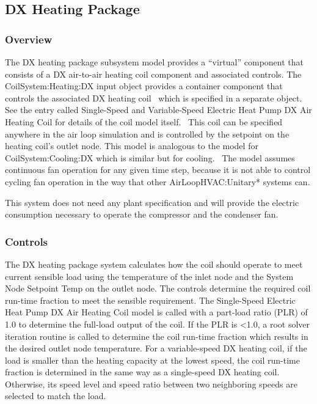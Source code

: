 \subsection{DX Heating Package}\label{dx-heating-package}

\subsubsection{Overview}\label{overview-6}

The DX heating package subsystem model provides a ``virtual'' component that consists of a DX air-to-air heating coil component and associated controls. The CoilSystem:Heating:DX input object provides a container component that controls the associated DX heating coil~ which is specified in a separate object. See the entry called Single-Speed and Variable-Speed Electric Heat Pump DX Air Heating Coil for details of the coil model itself.~ This coil can be specified anywhere in the air loop simulation and is controlled by the setpoint on the heating coil's outlet node. This model is analogous to the model for CoilSystem:Cooling:DX which is similar but for cooling.~ The model assumes continuous fan operation for any given time step, because it is not able to control cycling fan operation in the way that other AirLoopHVAC:Unitary* systems can.

This system does not need any plant specification and will provide the electric consumption necessary to operate the compressor and the condenser fan.

\subsubsection{Controls}\label{controls-2}

The DX heating package system calculates how the coil should operate to meet current sensible load using the temperature of the inlet node and the System Node Setpoint Temp on the outlet node. The controls determine the required coil run-time fraction to meet the sensible requirement. The Single-Speed Electric Heat Pump DX Air Heating Coil model is called with a part-load ratio (PLR) of 1.0 to determine the full-load output of the coil. If the PLR is \textless{}1.0, a root solver iteration routine is called to determine the coil run-time fraction which results in the desired outlet node temperature. For a variable-speed DX heating coil, if the load is smaller than the heating capacity at the lowest speed, the coil run-time fraction is determined in the same way as a single-speed DX heating coil. Otherwise, its speed level and speed ratio between two neighboring speeds are selected to match the load.

